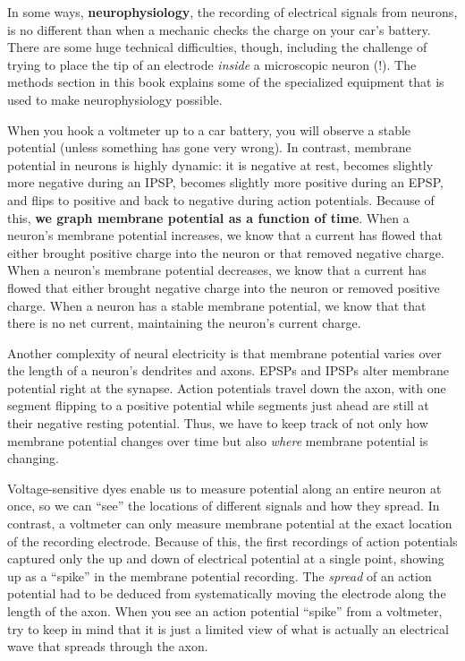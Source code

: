 \documentclass[
]{book}
\begin{document}
In some ways, \textbf{neurophysiology}, the recording of electrical signals from neurons, is no different than when a mechanic checks the charge on your car's battery. There are some huge technical difficulties, though, including the challenge of trying to place the tip of an electrode \emph{inside} a microscopic neuron (!). The methods section in this book explains some of the specialized equipment that is used to make neurophysiology possible.

When you hook a voltmeter up to a car battery, you will observe a stable potential (unless something has gone very wrong). In contrast, membrane potential in neurons is highly dynamic: it is negative at rest, becomes slightly more negative during an IPSP, becomes slightly more positive during an EPSP, and flips to positive and back to negative during action potentials. Because of this, \textbf{we graph membrane potential as a function of time}. When a neuron's membrane potential increases, we know that a current has flowed that either brought positive charge into the neuron or that removed negative charge. When a neuron's membrane potential decreases, we know that a current has flowed that either brought negative charge into the neuron or removed positive charge. When a neuron has a stable membrane potential, we know that that there is no net current, maintaining the neuron's current charge.

Another complexity of neural electricity is that membrane potential varies over the length of a neuron's dendrites and axons. EPSPs and IPSPs alter membrane potential right at the synapse. Action potentials travel down the axon, with one segment flipping to a positive potential while segments just ahead are still at their negative resting potential. Thus, we have to keep track of not only how membrane potential changes over time but also \emph{where} membrane potential is changing.

Voltage-sensitive dyes enable us to measure potential along an entire neuron at once, so we can ``see'' the locations of different signals and how they spread. In contrast, a voltmeter can only measure membrane potential at the exact location of the recording electrode. Because of this, the first recordings of action potentials captured only the up and down of electrical potential at a single point, showing up as a ``spike'' in the membrane potential recording. The \emph{spread} of an action potential had to be deduced from systematically moving the electrode along the length of the axon. When you see an action potential ``spike'' from a voltmeter, try to keep in mind that it is just a limited view of what is actually an electrical wave that spreads through the axon.
\end{document}
